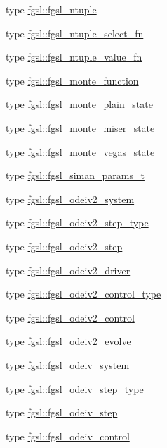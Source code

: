 \begin{DoxyCompactItemize}
type \hyperlink{structfgsl_1_1fgsl__ntuple}{fgsl\-::fgsl\-\_\-ntuple}
\item 
type \hyperlink{structfgsl_1_1fgsl__ntuple__select__fn}{fgsl\-::fgsl\-\_\-ntuple\-\_\-select\-\_\-fn}
\item 
type \hyperlink{structfgsl_1_1fgsl__ntuple__value__fn}{fgsl\-::fgsl\-\_\-ntuple\-\_\-value\-\_\-fn}
\item 
type \hyperlink{structfgsl_1_1fgsl__monte__function}{fgsl\-::fgsl\-\_\-monte\-\_\-function}
\item 
type \hyperlink{structfgsl_1_1fgsl__monte__plain__state}{fgsl\-::fgsl\-\_\-monte\-\_\-plain\-\_\-state}
\item 
type \hyperlink{structfgsl_1_1fgsl__monte__miser__state}{fgsl\-::fgsl\-\_\-monte\-\_\-miser\-\_\-state}
\item 
type \hyperlink{structfgsl_1_1fgsl__monte__vegas__state}{fgsl\-::fgsl\-\_\-monte\-\_\-vegas\-\_\-state}
\item 
type \hyperlink{structfgsl_1_1fgsl__siman__params__t}{fgsl\-::fgsl\-\_\-siman\-\_\-params\-\_\-t}
\item 
type \hyperlink{structfgsl_1_1fgsl__odeiv2__system}{fgsl\-::fgsl\-\_\-odeiv2\-\_\-system}
\item 
type \hyperlink{structfgsl_1_1fgsl__odeiv2__step__type}{fgsl\-::fgsl\-\_\-odeiv2\-\_\-step\-\_\-type}
\item 
type \hyperlink{structfgsl_1_1fgsl__odeiv2__step}{fgsl\-::fgsl\-\_\-odeiv2\-\_\-step}
\item 
type \hyperlink{structfgsl_1_1fgsl__odeiv2__driver}{fgsl\-::fgsl\-\_\-odeiv2\-\_\-driver}
\item 
type \hyperlink{structfgsl_1_1fgsl__odeiv2__control__type}{fgsl\-::fgsl\-\_\-odeiv2\-\_\-control\-\_\-type}
\item 
type \hyperlink{structfgsl_1_1fgsl__odeiv2__control}{fgsl\-::fgsl\-\_\-odeiv2\-\_\-control}
\item 
type \hyperlink{structfgsl_1_1fgsl__odeiv2__evolve}{fgsl\-::fgsl\-\_\-odeiv2\-\_\-evolve}
\item 
type \hyperlink{structfgsl_1_1fgsl__odeiv__system}{fgsl\-::fgsl\-\_\-odeiv\-\_\-system}
\item 
type \hyperlink{structfgsl_1_1fgsl__odeiv__step__type}{fgsl\-::fgsl\-\_\-odeiv\-\_\-step\-\_\-type}
\item 
type \hyperlink{structfgsl_1_1fgsl__odeiv__step}{fgsl\-::fgsl\-\_\-odeiv\-\_\-step}
\item 
type \hyperlink{structfgsl_1_1fgsl__odeiv__control}{fgsl\-::fgsl\-\_\-odeiv\-\_\-control}

\end{DoxyCompactItemize}
